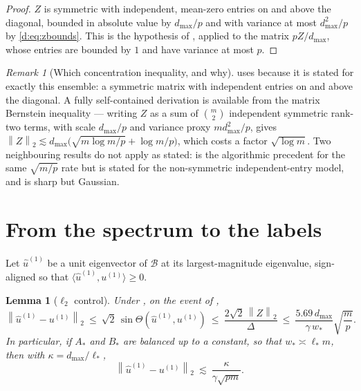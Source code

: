 \documentclass[11pt]{article}
\theoremstyle{plain}
\newtheorem{lemma}{Lemma}
\theoremstyle{definition}
\theoremstyle{remark}
\newtheorem{remark}{Remark}
\providecommand{\Bop}{\mathcal{B}}           %
\providecommand{\uone}{u^{(1)}}
\providecommand{\huone}{\hat u^{(1)}}
\providecommand{\1}{\mathbf{1}}
\providecommand{\norm}[1]{\left\lVert #1 \right\rVert}
\providecommand{\opnorm}[1]{\norm{#1}_{2}}
\newcommand{\dmax}{d_{\max}}
\newcommand{\wst}{w_{*}}
\newcommand{\Ast}{A_{*}}
\newcommand{\Bst}{B_{*}}
\begin{document}
\begin{proof}
$Z$ is symmetric with independent, mean-zero entries on and above the diagonal,
bounded in absolute value by $\dmax/p$ and with variance at most $\dmax^2/p$ by
\eqref{d:eq:zbounds}. This is the hypothesis of
\cite[Thm.~8.4]{chatterjee2015usvt}, applied to the matrix $pZ/\dmax$, whose
entries are bounded by $1$ and have variance at most $p$.
\end{proof}

\begin{remark}[Which concentration inequality, and why]\label{d:rem:whichbound}
 uses \cite{chatterjee2015usvt} because it is stated for
exactly this ensemble: a symmetric matrix with independent entries on and above
the diagonal. A fully self-contained derivation is available from the matrix
Bernstein inequality \cite[Thm.~1.4]{tropp2012userfriendly} --- writing $Z$ as a
sum of $\binom m2$ independent symmetric rank-two terms, with scale $\dmax/p$
and variance proxy $m\dmax^2/p$, gives
$\opnorm{Z}\lesssim\dmax\bigl(\sqrt{m\log m/p}+\log m/p\bigr)$, which costs a
factor $\sqrt{\log m}$. Two neighbouring results do not apply as stated:
\cite[Thm.~2]{achlioptas2007fast} is the algorithmic precedent for the same
$\sqrt{m/p}$ rate but is stated for the non-symmetric independent-entry model,
and \cite[Thm.~1.1]{bandeira2016sharp} is sharp but Gaussian.
\end{remark}

\section{From the spectrum to the labels}\label{d:sec:perturb}

Let $\huone$ be a unit eigenvector of $\widehat{\Bop}$ at its
largest-magnitude eigenvalue, sign-aligned so that
$\langle\huone,\uone\rangle\ge0$.

\begin{lemma}[$\ell_2$ control]\label{d:lem:dk}
Under , on the event of ,
\begin{equation}\label{d:eq:dk}
  \norm{\huone-\uone}_2\ \le\ \sqrt2\,\sin\Theta(\huone,\uone)
  \ \le\ \frac{2\sqrt2\,\opnorm{Z}}{\Delta}
  \ \le\ \frac{5.69\,\dmax}{\gamma\,\wst}\sqrt{\frac{m}{p}} .
\end{equation}
In particular, if $\Ast$ and $\Bst$ are balanced up to a constant, so that
$\wst\asymp\ell_*m$, then with $\kappa=\dmax/\ell_*$,
\begin{equation}\label{d:eq:dk2}
  \norm{\huone-\uone}_2\ \lesssim\ \frac{\kappa}{\gamma\sqrt{pm}} .
\end{equation}
\end{lemma}
\end{document}
